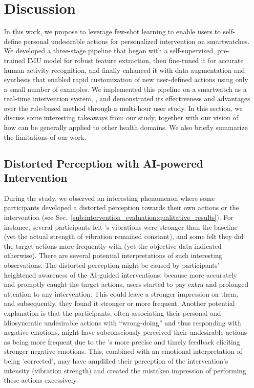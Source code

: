 \section{Discussion}
\label{sec:discussion}
In this work, we propose to leverage few-shot learning to enable users to self-define personal undesirable actions for personalized intervention on smartwatches.
We developed a three-stage pipeline that began with a self-supervised, pre-trained IMU model for robust feature extraction, then fine-tuned it for accurate human activity recognition, and finally enhanced it with data augmentation and synthesis that enabled rapid customization of new user-defined actions using only a small number of examples. 
We implemented this pipeline on a smartwatch as a real-time intervention system, \projectname, and demonstrated its effectiveness and advantages over the rule-based method through a multi-hour user study.
In this section, we discuss some interesting takeaways from our study, together with our vision of how \projectname can be generally applied to other health domains. We also briefly summarize the limitations of our work.


\subsection{Distorted Perception with AI-powered Intervention}
\label{sub:discussion:distorted}
During the study, we observed an interesting phenomenon where some participants developed a distorted perception towards their own actions or the intervention (see Sec.~\ref{sub:intervention_evaluation:qualitative_results}).
For instance, several participants felt \projectname's vibrations were stronger than the baseline (yet the actual strength of vibration remained constant), and some felt they did the target actions more frequently with \projectname (yet the objective data indicated otherwise).
There are several potential interpretations of such interesting observations.
The distorted perception might be caused by participants' heightened awareness of the AI-guided interventions: because \projectname more accurately and promptly caught the target actions, users started to pay extra and prolonged attention to any intervention. This could leave a stronger impression on them, and subsequently, they found it stronger or more frequent.
Another potential explanation is that the participants, often associating their personal and idiosyncratic undesirable actions with ``wrong-doing'' and thus responding with negative emotions, might have subconsciously perceived their undesirable actions as being more frequent due to the \projectname's more precise and timely feedback eliciting stronger negative emotions. This, combined with an emotional interpretation of being 'corrected', may have amplified their perception of the intervention's intensity (vibration strength) and created the mistaken impression of performing these actions excessively.

